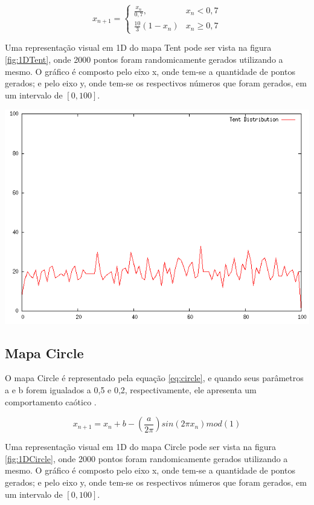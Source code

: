 \begin{equation}
\label{eq:tent}
x_{n + 1} =
\begin{cases}
    \frac{x_{n}}{0,7}, & \text{$x_{n} < 0,7$} \\
    \frac{10}{3}(1-x_{n}) & \text{$x_{n} \geq 0,7$} 
\end{cases}
\end{equation}

Uma representação visual em 1D do mapa Tent pode ser vista na figura \ref{fig:1DTent}, onde 2000 pontos foram randomicamente gerados utilizando a mesmo. O gráfico é composto pelo eixo x, onde tem-se a quantidade de pontos gerados; e pelo eixo y, onde tem-se os respectivos números que foram gerados, em um intervalo de $[0, 100]$.

{
    \centering
    \includegraphics[width=0.55\linewidth]{figuras/DistribuicaoTent.png}
    \label{fig:1DTent}
}

\subsection{Mapa Circle}

O mapa Circle é representado pela equação \ref{eq:circle}, e quando seus parâmetros a e b forem igualados a 0,5 e 0,2, respectivamente, ele apresenta um comportamento caótico \cite{gandomi}.

\begin{equation}
\label{eq:circle}
x_{n + 1} = x_{n} + b - (\frac{a}{2\pi}) sin(2\pi x_{n})mod(1)
\end{equation}

Uma representação visual em 1D do mapa Circle pode ser vista na figura \ref{fig:1DCircle}, onde 2000 pontos foram randomicamente gerados utilizando a mesmo. O gráfico é composto pelo eixo x, onde tem-se a quantidade de pontos gerados; e pelo eixo y, onde tem-se os respectivos números que foram gerados, em um intervalo de $[0, 100]$.

